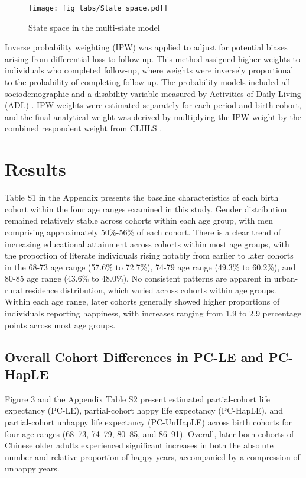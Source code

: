 \documentclass[12pt, a4paper]{article}
\begin{document}
\begin{figure}[htbp]
  \centering
  \texttt{[image: fig\_tabs/State\_space.pdf]}
  \caption{State space in the multi-state model}
  \label{fig:State_space}
\end{figure}

Inverse probability weighting (IPW) was applied to adjust for potential biases arising from differential loss to follow-up. This method assigned higher weights to individuals who completed follow-up, where weights were inversely proportional to the probability of completing follow-up. The probability models included all sociodemographic and a disability variable measured by Activities of Daily Living (ADL) \autocite{payne.2022.expansion,liu.2019.are,shen.2023.disability}. IPW weights were estimated separately for each period and birth cohort, and the final analytical weight was derived by multiplying the IPW weight by the combined respondent weight from CLHLS \autocite{dugoff.2014.generalizing,liu.2019.are}.

\section{Results}
Table S1 in the Appendix presents the baseline characteristics of each birth cohort within the four age ranges examined in this study. Gender distribution remained relatively stable across cohorts within each age group, with men comprising approximately 50\%-56\% of each cohort. There is a clear trend of increasing educational attainment across cohorts within most age groups, with the proportion of literate individuals rising notably from earlier to later cohorts in the 68-73 age range (57.6\% to 72.7\%), 74-79 age range (49.3\% to 60.2\%), and 80-85 age range (43.6\% to 48.0\%). No consistent patterns are apparent in urban-rural residence distribution, which varied across cohorts within age groups. Within each age range, later cohorts generally showed higher proportions of individuals reporting happiness, with increases ranging from 1.9 to 2.9 percentage points across most age groups.

\subsection{Overall Cohort Differences in PC-LE and PC-HapLE}

Figure 3 and the Appendix Table S2 present estimated partial-cohort life expectancy (PC-LE), partial-cohort happy life expectancy (PC-HapLE), and partial-cohort unhappy life expectancy (PC-UnHapLE) across birth cohorts for four age ranges (68–73, 74–79, 80–85, and 86–91). Overall, later-born cohorts of Chinese older adults experienced significant increases in both the absolute number and relative proportion of happy years, accompanied by a compression of unhappy years.
\end{document}
